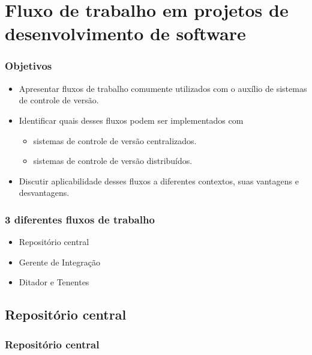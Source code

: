 \documentclass{beamer}
\begin{document}
\section[Fluxo de Trabalho]{Fluxo de trabalho em projetos de desenvolvimento de software}

\begin{frame}
  \frametitle{Objetivos}
  \begin{itemize}
    \item Apresentar fluxos de trabalho comumente utilizados com o
      auxílio de sistemas de controle de versão.
    \item Identificar quais desses fluxos podem ser implementados com
      \begin{itemize}
        \item sistemas de controle de versão centralizados.
        \item sistemas de controle de versão distribuídos.
      \end{itemize}
    \item Discutir aplicabilidade desses fluxos a diferentes contextos,
      suas vantagens e desvantagens.
  \end{itemize}
\end{frame}

\begin{frame}
  \frametitle{3 diferentes fluxos de trabalho}
  \begin{itemize}
    \item Repositório central
    \item Gerente de Integração
    \item Ditador e Tenentes
  \end{itemize}
\end{frame}

\subsection{Repositório central}

\begin{frame}
  \frametitle{Repositório central}
  \begin{figure}[h]
    \begin{center}
    \end{center}
    \label{fig:centralized-repository}
  \end{figure}
\end{frame}
\end{document}
